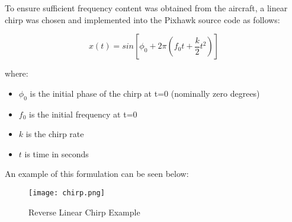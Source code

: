 To ensure sufficient frequency content was obtained from the aircraft, a linear chirp was chosen and implemented into the Pixhawk source code as follows:

\begin{equation}
x(t)=sin\left[\phi_0+2\pi\left(f_0t+\frac{k}{2}t^2\right)\right]
\end{equation}

where:
\begin{itemize}
 \item[] $\phi_0$ is the initial phase of the chirp at t=0 (nominally zero degrees)
 \item[] $f_0$ is the initial frequency at t=0
 \item[] $k$ is the chirp rate
 \item[] $t$  is time in seconds
\end{itemize}

An example of this formulation can be seen below:

\begin{figure}[!h]
 \centering
  \texttt{[image: chirp.png]}
  \caption{Reverse Linear Chirp Example}
  \label{fig:chirp}
\end{figure}





